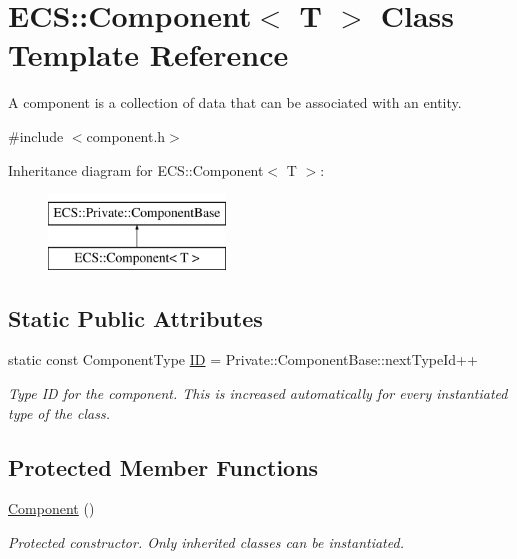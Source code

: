 \hypertarget{class_e_c_s_1_1_component}{\section{E\-C\-S\-:\-:Component$<$ T $>$ Class Template Reference}
\label{class_e_c_s_1_1_component}
}


A component is a collection of data that can be associated with an entity.  




{\ttfamily \#include $<$component.\-h$>$}

Inheritance diagram for E\-C\-S\-:\-:Component$<$ T $>$\-:\begin{figure}[H]
\begin{center}
\leavevmode
\includegraphics[height=2.000000cm]{class_e_c_s_1_1_component}
\end{center}
\end{figure}
\subsection*{Static Public Attributes}
\begin{DoxyCompactItemize}
\item 
\hypertarget{class_e_c_s_1_1_component_a7813f6e5f56ef7d373c984d5995602e6}{static const Component\-Type \hyperlink{class_e_c_s_1_1_component_a7813f6e5f56ef7d373c984d5995602e6}{I\-D} = Private\-::\-Component\-Base\-::next\-Type\-Id++}\label{class_e_c_s_1_1_component_a7813f6e5f56ef7d373c984d5995602e6}

\begin{DoxyCompactList}\small\item\em Type I\-D for the component. This is increased automatically for every instantiated type of the class. \end{DoxyCompactList}\end{DoxyCompactItemize}
\subsection*{Protected Member Functions}
\begin{DoxyCompactItemize}
\item 
\hypertarget{class_e_c_s_1_1_component_a91e0d98831c5692ba752b1233fd01b24}{\hyperlink{class_e_c_s_1_1_component_a91e0d98831c5692ba752b1233fd01b24}{Component} ()}\label{class_e_c_s_1_1_component_a91e0d98831c5692ba752b1233fd01b24}

\begin{DoxyCompactList}\small\item\em Protected constructor. Only inherited classes can be instantiated. \end{DoxyCompactList}\end{DoxyCompactItemize}


